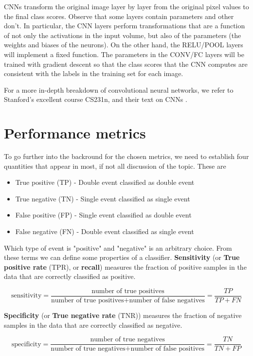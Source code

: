 \noindent CNNs transform the original image layer by layer from the original
pixel values to the final class scores. Observe that some layers contain
parameters and other don’t. In particular, the CNN layers perform
transformations that are a function of not only the activations in the
input volume, but also of the parameters (the weights and biases of
the neurons). On the other hand, the RELU/POOL layers will implement a
fixed function. The parameters in the CONV/FC layers will be trained
with gradient descent so that the class scores that the CNN computes
are consistent with the labels in the training set for each image.

\noindent For a more in-depth breakdown of convolutional neural networks,
we refer to Stanford's excellent course CS231n, and their text on CNNs \cite{cs231n}.

\section{Performance metrics}
To go further into the backround for the chosen metrics, we need to establish four 
quantities that appear in most, if not all discussion of the topic. These are
\begin{itemize}
	\item True positive (TP) - Double event classified as double event
	\item True negative (TN) - Single event classified as single event
	\item False positive (FP) - Single event classified as double event
	\item False negative (FN) - Double event classified as single event
\end{itemize}
\noindent Which type of event is "positive" and "negative" is an arbitrary choice.
From these terms we can define some properties of a classifier.
\textbf{Sensitivity} (or \textbf{True positive rate} (TPR), or \textbf{recall})
measures the fraction of positive samples in the data that are correctly classified 
as positive.

$$\text{sensitivity} = \frac{\text{number of true positives}}{\text{number of true positives} + \text{number of false negatives}} = \frac{TP}{TP + FN}$$

\noindent \textbf{Specificity} (or \textbf{True negative rate} (TNR)) measures the fraction 
of negative samples in the data that are correctly classified as negative.

$$\text{specificity} = \frac{\text{number of true negatives}}{\text{number of true negatives} + \text{number of false positives}} = \frac{TN}{TN + FP}$$

